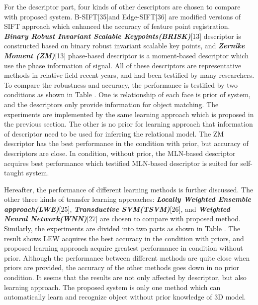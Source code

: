 \documentclass[journal]{IEEEtran}
\begin{document}
For the descriptor part, four kinds of other descriptors are chosen to compare with proposed system. B-SIFT[35]and Edge-SIFT[36] are modified versions of SIFT approach which enhanced the accuracy of feature point registration.  \textbf{\textit{Binary Robust Invariant Scalable Keypoints(BRISK)}}[13] descriptor is constructed based on binary robust invariant scalable key points, and \textbf{\textit{Zernike Moment (ZM)}}[13] phase-based descriptor is a moment-based descriptor which use the phase information of signal. All of these descriptors are representative methods in relative field recent years, and had been testified by many researchers. To compare the robustness and accuracy, the performance is testified by two conditions as shown in Table \uppercase\expandafter{}. One is relationship of each face is prior of system, and the descriptors only provide information for object matching. The experiments are implemented by the same learning approach which is proposed in the previous section. The other is no prior for learning approach that information of descriptor need to be used for inferring the relational model. The ZM descriptor has the best performance in the condition with prior, but accuracy of descriptors are close. In condition, without prior, the MLN-based descriptor acquires best performance which testified MLN-based descriptor is suited for self-taught system. 

Hereafter, the performance of different learning methods is further discussed. The other three kinds of transfer learning approaches: \textbf{\textit{Locally Weighted Ensemble approach(LWE)}}[25], \textbf{\textit{Transductive SVM(TSVM)}}[26], and \textbf{\textit{Weighted Neural Network(WNN)}}[27] are chosen to compare with proposed method. Similarly, the experiments are divided into two parts as shown in Table \uppercase\expandafter{}. The result shows LEW acquires the best accuracy in the condition with priors, and proposed learning approach acquire greatest performance in condition without prior. Although the performance between different methods are quite close when priors are provided, the accuracy of the other methods goes down in no prior condition. It seems that the results are not only affected by descriptor, but also learning approach. The proposed system is only one method which can automatically learn and recognize object without prior knowledge of 3D model. 


\newcommand{\tabincell}[2]{\begin{tabular}{@{}#1@{}}#2\end{tabular}}
\end{document}
